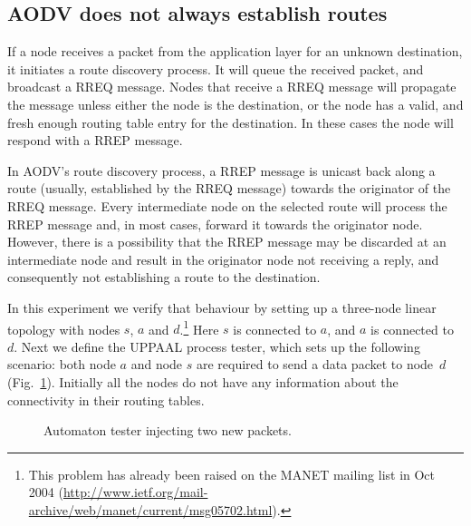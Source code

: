 \documentclass[conference,twoside]{IEEEtran}
\newcommand{\tester}{{\small\sf tester}\xspace}
\begin{document}
\subsection{AODV does not always establish routes}\label{subsec:non-optimal-route}

If a node receives a packet from the application layer for an
unknown destination, it initiates a route discovery process. It will
queue the received packet, and broadcast a RREQ message. Nodes that
receive a RREQ message will propagate the message unless either the
node is the destination, or the node has a valid, and fresh enough
routing table entry for the destination. In these cases the node will respond with a RREP message.



In AODV's route discovery process, a RREP message
is unicast back
along a route (usually, established by the RREQ message) towards the
originator of the RREQ message. Every intermediate node on the
selected route will process the RREP message and, in most cases,
forward it towards the originator node. However, there is a
possibility that the RREP message may be discarded at an intermediate
node and result in the originator node not receiving a
reply, and consequently not establishing a route to the destination.

In this experiment we verify that behaviour by setting up a three-node linear topology with nodes $s$, $a$ and $d$.\footnote{
This problem has already been raised on the MANET mailing list in Oct
2004 (\url{http://www.ietf.org/mail-archive/web/manet/current/msg05702.html}).}
Here $s$ is connected to $a$, and $a$ is connected to $d$.
Next we define the UPPAAL process {\tester}, which sets up the following scenario:
 both node $a$ and node $s$ are required to send a data packet to node~$d$ (Fig.~\ref{fig:tester}). Initially all the nodes do not have any information about the connectivity in their routing tables.

 \begin{figure}[h]
 \centering \fbox{
 \begin{minipage}{0.6\linewidth}
 \tester \\[2ex]
\hspace*{0.1\linewidth}\texttt{[image: fig/testerEx1]}
\end{minipage}
}
\caption{Automaton {\scriptsize\sf tester{}} injecting two new packets.}\label{fig:tester}
\end{figure}
\end{document}
